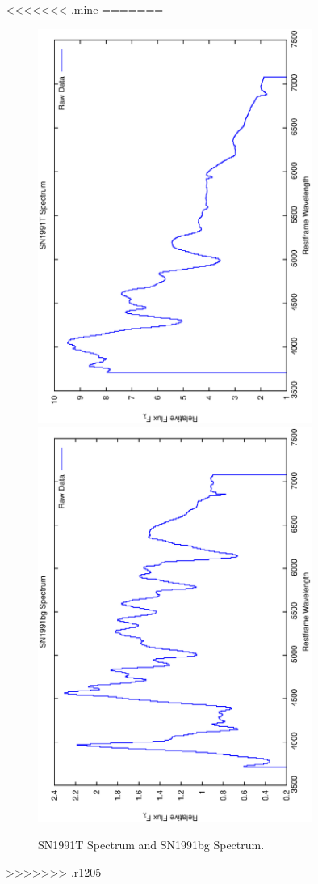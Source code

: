 \clearpage
<<<<<<< .mine
=======

\begin{figure}[p]
\centering
\includegraphics[angle=-90,width=0.8\textwidth]{./figures/spectrabeforeafter/SN1991T.ps}
\hfill
\includegraphics[angle=-90,width=0.8\textwidth]{./figures/spectrabeforeafter/SN1991bg.ps}
\hfill
\caption{SN1991T Spectrum and SN1991bg Spectrum.}
\label{fig:SN1991}
\end{figure}
\clearpage
>>>>>>> .r1205
